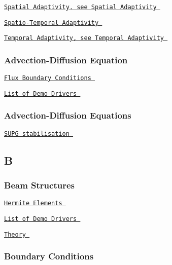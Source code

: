  
\begin{DoxyItemize}
\item  \href{ ../../index/html/index.html#S.SpatialAdaptivity }{\tt Spatial Adaptivity, see Spatial Adaptivity }  
\item  \href{ ../../unsteady_heat/two_d_unsteady_heat_2adapt/html/index.html }{\tt Spatio-\/\-Temporal Adaptivity }  
\item  \href{ ../../index/html/index.html#T.TemporalAdaptivity }{\tt Temporal Adaptivity, see Temporal Adaptivity }  
\end{DoxyItemize} \subsubsection*{ Advection-\/\-Diffusion Equation }

 
\begin{DoxyItemize}
\item  \href{ ../../advection_diffusion/two_d_adv_diff_flux_bc/html/index.html }{\tt Flux Boundary Conditions }  
\item  \href{ ../../example_code_list/html/index.html#adv_diff }{\tt List of Demo Drivers }  
\end{DoxyItemize} \subsubsection*{ Advection-\/\-Diffusion Equations }

 
\begin{DoxyItemize}
\item  \href{ ../../advection-diffusion/two_d_adv_diff_SUPG/html/index.html }{\tt S\-U\-P\-G stabilisation }  
\end{DoxyItemize}  \subsection*{ B }

 \subsubsection*{ Beam Structures }

 
\begin{DoxyItemize}
\item  \href{ ../../beam/tensioned_string/html/index.html#hermite }{\tt Hermite Elements }  
\item  \href{ ../../example_code_list/html/index.html#beam }{\tt List of Demo Drivers }  
\item  \href{ ../../beam/tensioned_string/html/index.html }{\tt Theory }  
\end{DoxyItemize} \subsubsection*{ Boundary Conditions }

